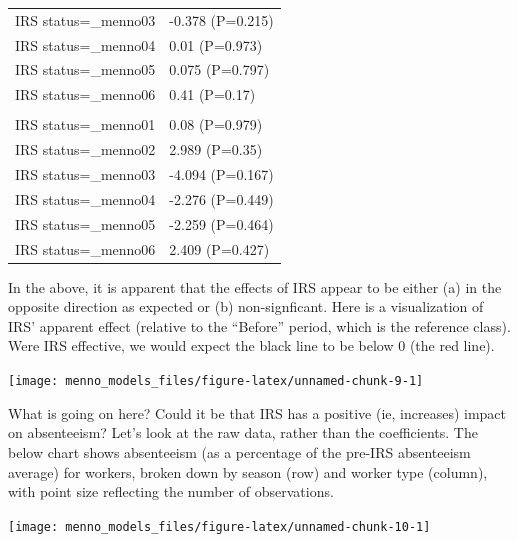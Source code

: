 \documentclass[]{article}
\begin{document}
\begin{longtable}[t]{ll}
\hspace{1em}IRS status=\_menno03 & -0.378 (P=0.215)\\
\hspace{1em}IRS status=\_menno04 & 0.01 (P=0.973)\\
\hspace{1em}IRS status=\_menno05 & 0.075 (P=0.797)\\
\hspace{1em}IRS status=\_menno06 & 0.41 (P=0.17)\\
\addlinespace[1.5em]
\multicolumn{2}{l}{\textbf{Temporary not field worker}}\\
\hspace{1em}IRS status=\_menno01 & 0.08 (P=0.979)\\
\hspace{1em}IRS status=\_menno02 & 2.989 (P=0.35)\\
\hspace{1em}IRS status=\_menno03 & -4.094 (P=0.167)\\
\hspace{1em}IRS status=\_menno04 & -2.276 (P=0.449)\\
\hspace{1em}IRS status=\_menno05 & -2.259 (P=0.464)\\
\hspace{1em}IRS status=\_menno06 & 2.409 (P=0.427)\\*
\end{longtable}

In the above, it is apparent that the effects of IRS appear to be either
(a) in the opposite direction as expected or (b) non-signficant. Here is
a visualization of IRS' apparent effect (relative to the ``Before''
period, which is the reference class). Were IRS effective, we would
expect the black line to be below 0 (the red line).

\begin{center}\texttt{[image: menno\_models\_files/figure-latex/unnamed-chunk-9-1]} \end{center}

What is going on here? Could it be that IRS has a positive (ie,
increases) impact on absenteeism? Let's look at the raw data, rather
than the coefficients. The below chart shows absenteeism (as a
percentage of the pre-IRS absenteeism average) for workers, broken down
by season (row) and worker type (column), with point size reflecting the
number of observations.

\begin{center}\texttt{[image: menno\_models\_files/figure-latex/unnamed-chunk-10-1]} \end{center}
\end{document}
